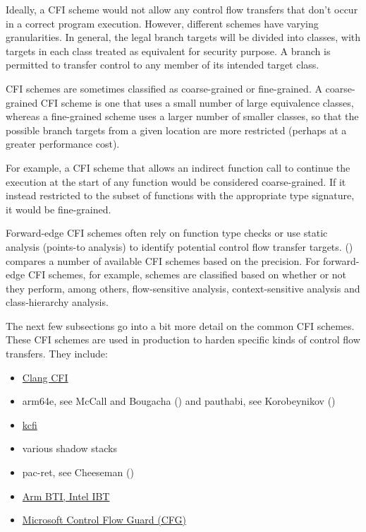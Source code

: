 \documentclass[
  a4paper,
]{report}
\providecommand{\tightlist}{%
  \setlength{\itemsep}{0pt}\setlength{\parskip}{0pt}}
\begin{document}
Ideally, a CFI scheme would not allow any control flow transfers that
don't occur in a correct program execution. However, different schemes
have varying granularities. In general, the legal branch targets will be
divided into classes, with targets in each class treated as equivalent
for security purpose. A branch is permitted to transfer control to any
member of its intended target class.

CFI schemes are sometimes classified as
\label{__index_entry_33}{coarse-grained}
or
\label{__index_entry_34}{fine-grained}.
A coarse-grained CFI scheme is one that uses a small number of large
equivalence classes, whereas a fine-grained scheme uses a larger number
of smaller classes, so that the possible branch targets from a given
location are more restricted (perhaps at a greater performance cost).

For example, a CFI scheme that allows an indirect function call to
continue the execution at the start of any function would be considered
coarse-grained. If it instead restricted to the subset of functions with
the appropriate type signature, it would be fine-grained.

Forward-edge CFI schemes often rely on function type checks or use
static analysis (points-to analysis) to identify potential control flow
transfer targets. () compares
a number of available CFI schemes based on the precision. For
forward-edge CFI schemes, for example, schemes are classified based on
whether or not they perform, among others, flow-sensitive analysis,
context-sensitive analysis and class-hierarchy analysis.

The next few subsections go into a bit more detail on the common CFI
schemes. These CFI schemes are used in production to harden specific
kinds of control flow transfers. They include:

\begin{itemize}
\tightlist
\item
  \href{https://clang.llvm.org/docs/ControlFlowIntegrityDesign.html}{Clang
  CFI}
\item
  arm64e, see McCall and Bougacha () and
  pauthabi, see Korobeynikov ()
\item
  \href{https://reviews.llvm.org/D119296}{kcfi}
\item
  various shadow stacks
\item
  pac-ret, see Cheeseman ()
\item
  \href{https://en.wikipedia.org/wiki/Indirect_branch_tracking}{Arm BTI,
  Intel IBT}
\item
  \href{https://learn.microsoft.com/en-us/windows/win32/secbp/control-flow-guard}{Microsoft
  Control Flow Guard (CFG)}
\end{itemize}
\end{document}
